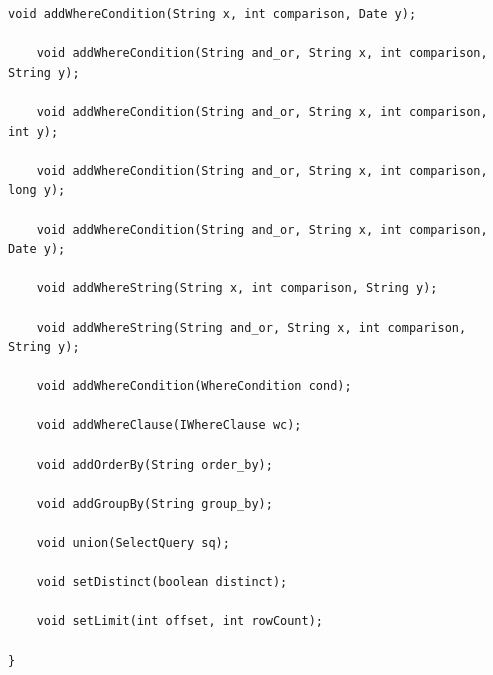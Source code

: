 \begin{lstlisting}[title=código interfaz UpdateStatement]
	void addWhereCondition(String x, int comparison, Date y);

	void addWhereCondition(String and_or, String x, int comparison, String y);

	void addWhereCondition(String and_or, String x, int comparison, int y);

	void addWhereCondition(String and_or, String x, int comparison, long y);

	void addWhereCondition(String and_or, String x, int comparison, Date y);

	void addWhereString(String x, int comparison, String y);

	void addWhereString(String and_or, String x, int comparison, String y);

	void addWhereCondition(WhereCondition cond);

	void addWhereClause(IWhereClause wc);

	void addOrderBy(String order_by);

	void addGroupBy(String group_by);

	void union(SelectQuery sq);

	void setDistinct(boolean distinct);

	void setLimit(int offset, int rowCount);

}
\end{lstlisting}

